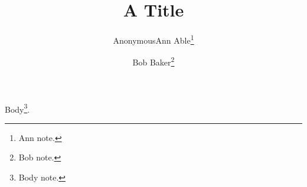 \documentclass{llncs}
\title{A Title}
\author{\ifdefined\Anonymous Anonymous\else Ann Able\thanks{Ann note.} \and Bob Baker\thanks{Bob note.}\fi}
\institute{Lab A}
\begin{document}
\maketitle
Body\footnote{Body note.}.
\end{document}
